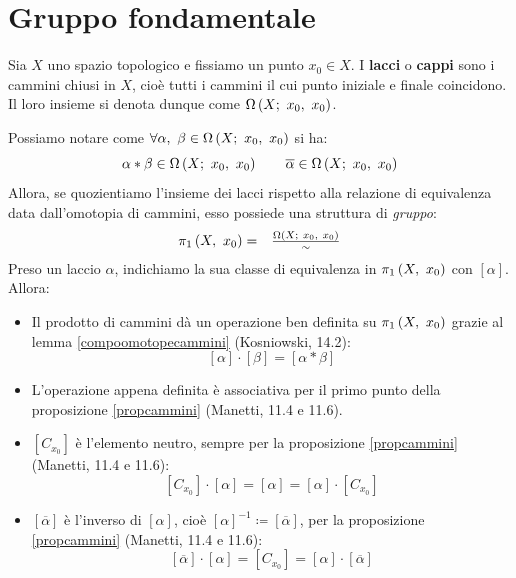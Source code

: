 \section{Gruppo fondamentale}
\begin{define}
	Sia $X$ uno spazio topologico e fissiamo un punto $x_0\in X$. I \textbf{lacci} o \textbf{cappi} sono i cammini chiusi in $X$, cioè tutti i cammini il cui punto iniziale e finale coincidono. Il loro insieme si denota dunque come $\Omega\left(X;\ x_0,\ x_0\right)$.
\end{define}
\begin{observe}
	Possiamo notare come $\forall\alpha,\ \beta\in\inscam{X}{x_0}{x_0}$ si ha:
	\begin{equation*}
		\alpha\ast\beta\in\Omega\left(X;\ x_0,\ x_0\right)\qquad \overline{\alpha}\in\Omega\left(X;\ x_0,\ x_0\right)
	\end{equation*}
Allora, se quozientiamo l'insieme dei lacci rispetto alla relazione di equivalenza data dall'omotopia di cammini, esso possiede una struttura di \textit{gruppo}:
\begin{equation}
	\begin{array}{cc}
	\gruf{X}{x_0}=&\frac{\inscam{X}{x_0}{x_0}}{\sim}
	\end{array}	
\end{equation}
Preso un laccio $\alpha$, indichiamo la sua classe di equivalenza in $\gruf{X}{x_0}$ con $\left[\alpha\right]$. Allora:
\begin{itemize}
	\item Il prodotto di cammini dà un operazione ben definita su $\gruf{X}{x_0}$ grazie al lemma \ref{compoomotopecammini} (Kosniowski, 14.2):
	\begin{equation}
		\left[\alpha\right]\cdot\left[\beta\right]=\left[\alpha\ast\beta\right]
	\end{equation}
\item L'operazione appena definita è associativa per il primo punto della proposizione \ref{propcammini} (Manetti, 11.4 e 11.6).
\item $\left[C_{x_0}\right]$ è l'elemento neutro, sempre per la proposizione \ref{propcammini} (Manetti, 11.4 e 11.6):
\begin{equation}
	\left[C_{x_0}\right]\cdot\left[\alpha\right]=\left[\alpha\right]=\left[\alpha\right]\cdot\left[C_{x_0}\right]
\end{equation} 
\item $\left[\overline{\alpha}\right]$ è l'inverso di $\left[\alpha\right]$, cioè $\left[\alpha\right]^{-1}\coloneqq\left[\overline{\alpha}\right]$, per la proposizione \ref{propcammini} (Manetti, 11.4 e 11.6):
\begin{equation}
\left[\overline{\alpha}\right]\cdot\left[\alpha\right]=\left[C_{x_0}\right]=\left[\alpha\right]\cdot\left[\overline{\alpha}\right]
\end{equation}
\end{itemize}
\vspace{-6mm}
\end{observe}
